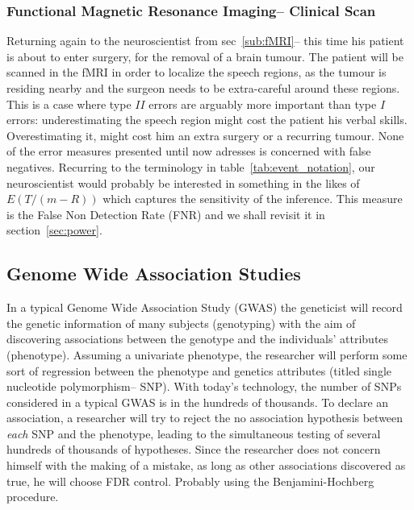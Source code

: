 \documentclass[review,12pt]{article}
\begin{document}
\subsubsection{Functional Magnetic Resonance Imaging-- Clinical Scan}
Returning again to the neuroscientist from sec~\ref{sub:fMRI}-- this time his patient is about to enter surgery, for the removal of a brain tumour. The patient will be scanned in the fMRI in order to localize the speech regions, as the tumour is residing nearby and the surgeon needs to be extra-careful around these regions. This is a case where type $II$ errors are arguably more important than type $I$ errors: underestimating the speech region might cost the patient his verbal skills. Overestimating it, might cost him an extra surgery or a recurring tumour. None of the error measures presented until now adresses is concerned with false negatives. Recurring to the terminology in table~\ref{tab:event_notation}, our neuroscientist would probably be interested in something in the likes of $E(T/(m-R))$ which captures the sensitivity of the inference. This measure is the False Non Detection Rate (FNR) \citep{genovese_ROC_2002} and we shall revisit it in section~\ref{sec:power}. 




\subsection{Genome Wide Association Studies}
In a typical Genome Wide Association Study (GWAS) the geneticist will record the genetic information of many subjects (genotyping) with the aim of discovering associations between the genotype and the individuals' attributes (phenotype). Assuming a univariate phenotype, the researcher will perform some sort of regression between the phenotype and genetics attributes (titled single nucleotide polymorphism-- SNP). With today's technology, the number of SNPs considered in a typical GWAS is in the hundreds of thousands. To declare an association, a researcher will try to reject the no association hypothesis between \emph{each} SNP and the phenotype, leading to the simultaneous testing of several hundreds of thousands of hypotheses. Since the researcher does not concern himself with the making of a mistake, as long as other associations discovered as true, he will choose FDR control. Probably using the Benjamini-Hochberg procedure.




\end{document}
